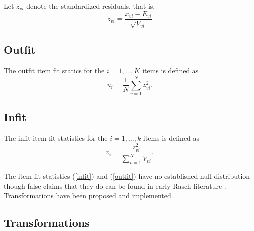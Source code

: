 \documentclass[11pt,a4paper]{article}
\begin{document}
Let $z_{vi}$ denote the standardized residuals, that is,
$$
z_{vi} = \frac{x_{vi} - E_{vi}}{\sqrt{V_{vi}}}
$$

\subsection{Outfit}

The outfit item fit statics for the $i=1,\ldots,K$ items is defined as
\begin{equation}
u_i = \frac1N\sum_{v=1}^N z_{vi}^2.
\label{outfit}
\end{equation}

\subsection{Infit}

The infit item fit statistics for the $i=1,\ldots,k$ items is defined as
\begin{equation}
v_i = \frac{z_{vi}^2}{\sum_{v = 1}^N V_{vi}}.
\label{infit}    
\end{equation}


The item fit statistics (\ref{infit}) and (\ref{outfit}) have no established null distribution though false claims that they do can be found in early Rasch literature \cite{Wright-Panchapakesan-1969,wright-Stone-1979}. Transformations have been proposed and implemented.

\subsection{Transformations}
\end{document}
